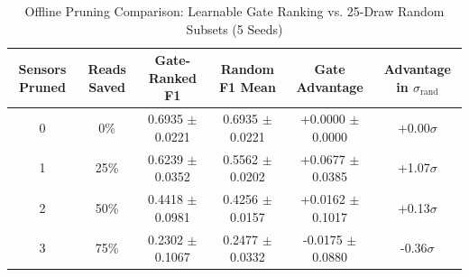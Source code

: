 \begin{table}[t]
\centering
\caption{Offline Pruning Comparison: Learnable Gate Ranking vs. 25-Draw Random Subsets (5 Seeds)}
\label{tab:pruning_sweep}
\small
\begin{tabular}{cccccc}
\toprule
\textbf{Sensors Pruned} & \textbf{Reads Saved} & \textbf{Gate-Ranked F1} & \textbf{Random F1 Mean} & \textbf{Gate Advantage} & \textbf{Advantage in $\sigma_{\text{rand}}$} \\
\midrule
0 & 0\% & 0.6935 $\pm$ 0.0221 & 0.6935 $\pm$ 0.0221 & +0.0000 $\pm$ 0.0000 & +0.00$\sigma$ \\
1 & 25\% & 0.6239 $\pm$ 0.0352 & 0.5562 $\pm$ 0.0202 & +0.0677 $\pm$ 0.0385 & +1.07$\sigma$ \\
2 & 50\% & 0.4418 $\pm$ 0.0981 & 0.4256 $\pm$ 0.0157 & +0.0162 $\pm$ 0.1017 & +0.13$\sigma$ \\
3 & 75\% & 0.2302 $\pm$ 0.1067 & 0.2477 $\pm$ 0.0332 & -0.0175 $\pm$ 0.0880 & -0.36$\sigma$ \\
\bottomrule
\end{tabular}
\end{table}